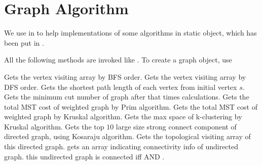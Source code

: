 \section{Graph Algorithm}
We use  in  to help implementations of some algorithms in  static object, which has been put in .

All the following methods are invoked like . To create a graph object, use  

Gets the vertex visiting array by BFS order.
Gets the vertex visiting array by DFS order.
Gets the shortest path length of each vertex from initial vertex $s$.
Gets the minimum cut number of graph after that times calculations.
Gets the total MST cost of weighted graph by Prim algorithm.
Gets the total MST cost of weighted graph by Kruskal algorithm.
Gets the max space of k-clustering by Kruskal algorithm.
Gets the top $10$ large size strong connect component of directed graph, using Kosaraju algorithm.
Gets the topological visiting array of this directed graph.
 gets an array indicating connectivity info of undirected graph. this undirected graph is connected iff   AND .